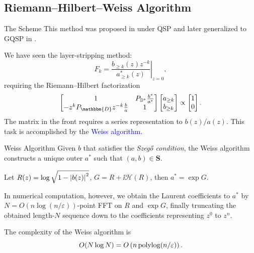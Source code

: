 \subsection{Riemann--Hilbert--Weiss Algorithm}
\begin{frame}{The Scheme}
    This method was proposed in \cite{Szego} under QSP and later generalized to GQSP in \cite{GQSP_NLFT}.
    
    We have seen the layer-stripping method:
    \begin{equation*}
        F_k =  \left.\frac{b_{\ge k}(z) z^{-k}}{a_{\ge k}^*(z)}\right|_{z=0},
    \end{equation*}
    requiring the Riemann--Hilbert factorization
    \begin{equation}
        \left[\begin{matrix}
            1 & P_{\mathbb{D}^*}\frac{b^*}{a^*} \\
            -z^k P_{\mathbbm{D}}z^{-k}\frac{b}{a} & 1
        \end{matrix}\right] \left[\begin{matrix}
            a_{\ge k} \\ b_{\ge k}
        \end{matrix}\right] \propto \left[\begin{matrix}
            1 \\ 0
        \end{matrix}\right].
    \end{equation}
    The matrix in the front requires a series representation to $b(z)/a(z)$. This task is accomplished by the \textcolor{blue}{Weiss algorithm}.
\end{frame}

\begin{frame}{Weiss Algorithm}
    Given $b$ that satisfies the \textit{\color{red}Szeg\H{o} condition}, the Weiss algorithm constructs a unique outer $a^*$ such that $(a,b)\in\mathbf{S}$.
    
    Let $R(z) = \log\sqrt{1-\left|{b(z)}\right|^2}$, $G = R + \ii\mathcal{H}(R)$, then $a^* = \exp G$.

    In numerical computation, however, we obtain the Laurent coefficients to $a^*$ by $N=O(n\log (n/\varepsilon))$-point FFT on $R$ and $\exp G$, finally truncating the obtained length-$N$ sequence down to the coefficients representing $z^0$ to $z^n$.

    The complexity of the Weiss algorithm is
    \begin{equation*}
        O(N\log N) = O\left(n\operatorname{\mathrm{polylog}}(n/\varepsilon)\right).
    \end{equation*}
\end{frame}

